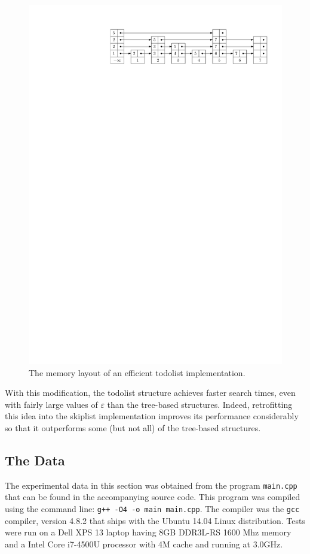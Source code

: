 \documentclass[12pt]{patmorin}
\newcommand{\eps}{\varepsilon}
\begin{document}
\begin{figure}
   \centerline{\includegraphics{packed-in}}
   \caption{The memory layout of an efficient todolist implementation.}
\end{figure}

With this modification, the todolist structure achieves faster search
times, even with fairly large values of $\eps$ than the tree-based
structures. Indeed, retrofitting this idea into the skiplist
implementation improves its performance considerably so that it
outperforms some (but not all) of the tree-based structures.

\subsection{The Data}

The experimental data in this section was obtained from the program
\texttt{main.cpp} that can be found in the accompanying source code.
This program was compiled using the command line: \texttt{g++ -O4 -o
main main.cpp}. The compiler was the \texttt{gcc} compiler, version
4.8.2 that ships with the Ubuntu 14.04 Linux distribution.  Tests were
run on a Dell XPS 13 laptop having 8GB DDR3L-RS 1600 Mhz memory and a
Intel Core i7-4500U processor with 4M cache and running at 3.0GHz.
\end{document}
